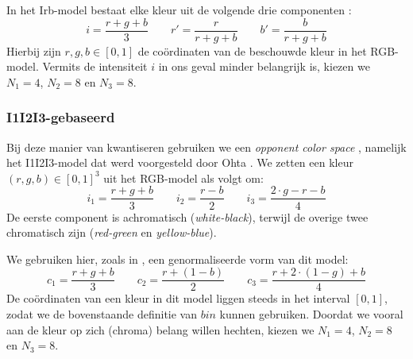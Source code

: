 In het Irb-model bestaat elke kleur uit de volgende drie componenten \cite{ohta:color_info_for_region_segm}:
$$
i = \frac{r+g+b}{3} \qquad
r' = \frac{r}{r+g+b} \qquad
b' = \frac{b}{r+g+b}
$$
Hierbij zijn $r,g,b \in [0,1]$ de co\"ordinaten van de beschouwde kleur in het RGB-model.
Vermits de intensiteit $i$ in ons geval minder belangrijk is, kiezen we $N_1=4$, $N_2=8$ en $N_3=8$.

%

\subsubsection{I1I2I3-gebaseerd}

Bij deze manier van kwantiseren gebruiken we een
\emph{opponent color space} \cite{tkalcic:colour_spaces, sharma:digital_color_imaging}, namelijk het I1I2I3-model dat werd voorgesteld door 
Ohta \cite{ohta:color_info_for_region_segm}. We zetten een kleur $(r,g,b) \in [0,1]^3$ uit het RGB-model als volgt om:
$$
i_1 = \frac{r+g+b}{3} \qquad
i_2 = \frac{r-b}{2} \qquad
i_3 = \frac{2 \cdot g - r - b}{4}
$$
De eerste component is achromatisch (\emph{white-black}), terwijl de overige twee 
chromatisch zijn (\emph{red-green} en \emph{yellow-blue}).

We gebruiken hier, zoals in \cite{wang:cbir_using_daubechies_wavelets}, een genormaliseerde vorm van dit model:
$$
c_1 = \frac{r+g+b}{3} \qquad
c_2 = \frac{r + (1 - b)}{2} \qquad
c_3 = \frac{r + 2 \cdot (1 - g) + b}{4}
$$
De co\"ordinaten van een kleur in dit model liggen steeds in het interval $[0,1]$,
zodat we de bovenstaande definitie van $bin$ kunnen gebruiken. 
Doordat we vooral aan de kleur op zich (chroma) belang willen hechten, kiezen we 
$N_1=4$, $N_2=8$ en $N_3=8$.

